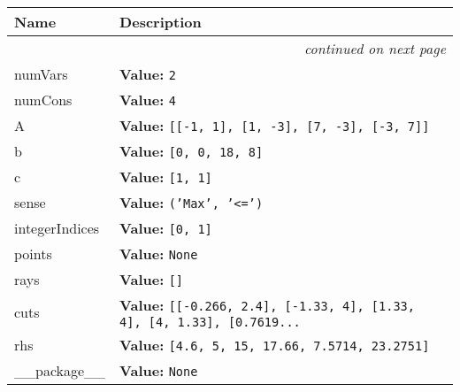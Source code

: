     \vspace{-1cm}
\hspace{\varindent}\begin{longtable}{|p{\varnamewidth}|p{\vardescrwidth}|l}
\cline{1-2}
\cline{1-2} \centering \textbf{Name} & \centering \textbf{Description}& \\
\cline{1-2}
\endhead\cline{1-2}\multicolumn{3}{r}{\small\textit{continued on next page}}\\\endfoot\cline{1-2}
\endlastfoot\raggedright n\-u\-m\-V\-a\-r\-s\- & \raggedright \textbf{Value:} 
{\tt 2}&\\
\cline{1-2}
\raggedright n\-u\-m\-C\-o\-n\-s\- & \raggedright \textbf{Value:} 
{\tt 4}&\\
\cline{1-2}
\raggedright A\- & \raggedright \textbf{Value:} 
{\tt \texttt{[}\texttt{[}-1\texttt{, }1\texttt{]}\texttt{, }\texttt{[}1\texttt{, }-3\texttt{]}\texttt{, }\texttt{[}7\texttt{, }-3\texttt{]}\texttt{, }\texttt{[}-3\texttt{, }7\texttt{]}\texttt{]}}&\\
\cline{1-2}
\raggedright b\- & \raggedright \textbf{Value:} 
{\tt \texttt{[}0\texttt{, }0\texttt{, }18\texttt{, }8\texttt{]}}&\\
\cline{1-2}
\raggedright c\- & \raggedright \textbf{Value:} 
{\tt \texttt{[}1\texttt{, }1\texttt{]}}&\\
\cline{1-2}
\raggedright s\-e\-n\-s\-e\- & \raggedright \textbf{Value:} 
{\tt \texttt{(}\texttt{'}\texttt{Max}\texttt{'}\texttt{, }\texttt{'}\texttt{{\textless}=}\texttt{'}\texttt{)}}&\\
\cline{1-2}
\raggedright i\-n\-t\-e\-g\-e\-r\-I\-n\-d\-i\-c\-e\-s\- & \raggedright \textbf{Value:} 
{\tt \texttt{[}0\texttt{, }1\texttt{]}}&\\
\cline{1-2}
\raggedright p\-o\-i\-n\-t\-s\- & \raggedright \textbf{Value:} 
{\tt None}&\\
\cline{1-2}
\raggedright r\-a\-y\-s\- & \raggedright \textbf{Value:} 
{\tt \texttt{[}\texttt{]}}&\\
\cline{1-2}
\raggedright c\-u\-t\-s\- & \raggedright \textbf{Value:} 
{\tt \texttt{[}\texttt{[}-0.266\texttt{, }2.4\texttt{]}\texttt{, }\texttt{[}-1.33\texttt{, }4\texttt{]}\texttt{, }\texttt{[}1.33\texttt{, }4\texttt{]}\texttt{, }\texttt{[}4\texttt{, }1.33\texttt{]}\texttt{, }\texttt{[}0.7619\texttt{...}}&\\
\cline{1-2}
\raggedright r\-h\-s\- & \raggedright \textbf{Value:} 
{\tt \texttt{[}4.6\texttt{, }5\texttt{, }15\texttt{, }17.66\texttt{, }7.5714\texttt{, }23.2751\texttt{]}}&\\
\cline{1-2}
\raggedright \_\-\_\-p\-a\-c\-k\-a\-g\-e\-\_\-\_\- & \raggedright \textbf{Value:} 
{\tt None}&\\
\cline{1-2}
\end{longtable}

